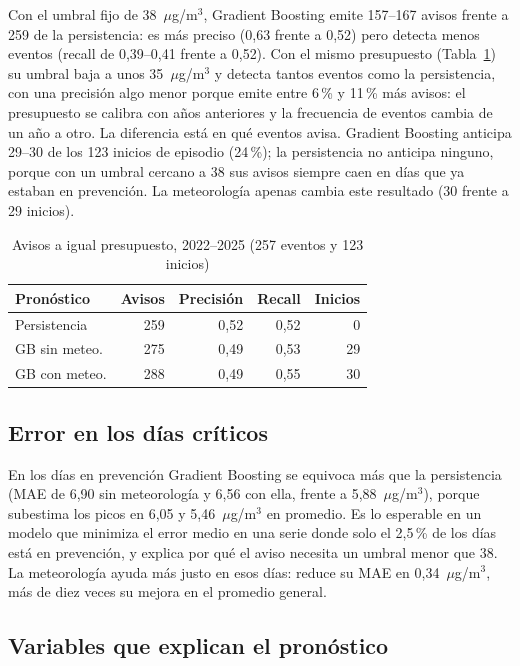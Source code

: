\documentclass[conference]{IEEEtran}
\begin{document}
Con el umbral fijo de 38~$\mu$g/m$^3$, Gradient Boosting emite 157--167
avisos frente a 259 de la persistencia: es más preciso (0,63 frente a
0,52) pero detecta menos eventos (recall de 0,39--0,41 frente a 0,52). Con
el mismo presupuesto (Tabla~\ref{tab:avisos}) su umbral baja a unos
35~$\mu$g/m$^3$ y detecta tantos eventos como la persistencia, con una
precisión algo menor porque emite entre 6\,\% y 11\,\% más avisos: el
presupuesto se calibra con años anteriores y la frecuencia de eventos
cambia de un año a otro. La diferencia está en qué eventos avisa.
Gradient Boosting anticipa 29--30 de los 123 inicios de episodio
(24\,\%); la persistencia no anticipa ninguno, porque con un umbral
cercano a 38 sus avisos siempre caen en días que ya estaban en
prevención. La meteorología apenas cambia este resultado (30 frente a 29
inicios).

\begin{table}[htbp]
\centering
\caption{Avisos a igual presupuesto, 2022--2025 (257 eventos y 123
inicios)}
\label{tab:avisos}
\begin{tabular}{lrrrr}
\toprule
\textbf{Pronóstico} & \textbf{Avisos} & \textbf{Precisión} & \textbf{Recall} & \textbf{Inicios} \\
\midrule
Persistencia & 259 & 0,52 & 0,52 & 0 \\
GB sin meteo. & 275 & 0,49 & 0,53 & 29 \\
GB con meteo. & 288 & 0,49 & 0,55 & 30 \\
\bottomrule
\end{tabular}
\end{table}

\subsection{Error en los días críticos}

En los días en prevención Gradient Boosting se equivoca más que la
persistencia (MAE de 6,90 sin meteorología y 6,56 con ella, frente a
5,88~$\mu$g/m$^3$), porque subestima los picos en 6,05 y 5,46~$\mu$g/m$^3$
en promedio. Es lo esperable en un modelo que minimiza el error medio en
una serie donde solo el 2,5\,\% de los días está en prevención, y explica
por qué el aviso necesita un umbral menor que 38. La meteorología ayuda
más justo en esos días: reduce su MAE en 0,34~$\mu$g/m$^3$, más de diez
veces su mejora en el promedio general.

\subsection{Variables que explican el pronóstico}
\end{document}
